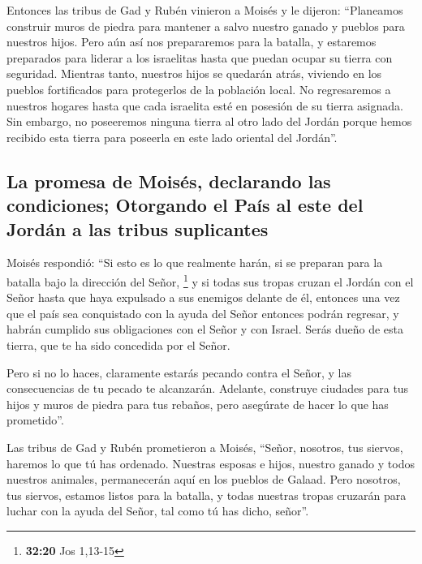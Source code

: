  Entonces las tribus de Gad y Rubén vinieron a Moisés y
le dijeron: ``Planeamos construir muros de piedra para mantener a salvo
nuestro ganado y pueblos para nuestros hijos.  Pero aún
así nos prepararemos para la batalla, y estaremos preparados para
liderar a los israelitas hasta que puedan ocupar su tierra con
seguridad. Mientras tanto, nuestros hijos se quedarán atrás, viviendo en
los pueblos fortificados para protegerlos de la población local.
 No regresaremos a nuestros hogares hasta que cada
israelita esté en posesión de su tierra asignada.  Sin
embargo, no poseeremos ninguna tierra al otro lado del Jordán porque
hemos recibido esta tierra para poseerla en este lado oriental del
Jordán''.

\hypertarget{la-promesa-de-moisuxe9s-declarando-las-condiciones-otorgando-el-pauxeds-al-este-del-jorduxe1n-a-las-tribus-suplicantes}{%
\subsection{La promesa de Moisés, declarando las condiciones; Otorgando
el País al este del Jordán a las tribus
suplicantes}\label{la-promesa-de-moisuxe9s-declarando-las-condiciones-otorgando-el-pauxeds-al-este-del-jorduxe1n-a-las-tribus-suplicantes}}

 Moisés respondió: ``Si esto es lo que realmente harán,
si se preparan para la batalla bajo la dirección del Señor, \footnote{\textbf{32:20}
  Jos 1,13-15}  y si todas sus tropas cruzan el Jordán
con el Señor hasta que haya expulsado a sus enemigos delante de él,
 entonces una vez que el país sea conquistado con la
ayuda del Señor entonces podrán regresar, y habrán cumplido sus
obligaciones con el Señor y con Israel. Serás dueño de esta tierra, que
te ha sido concedida por el Señor.

 Pero si no lo haces, claramente estarás pecando contra
el Señor, y las consecuencias de tu pecado te alcanzarán.
 Adelante, construye ciudades para tus hijos y muros de
piedra para tus rebaños, pero asegúrate de hacer lo que has prometido''.

 Las tribus de Gad y Rubén prometieron a Moisés, ``Señor,
nosotros, tus siervos, haremos lo que tú has ordenado. 
Nuestras esposas e hijos, nuestro ganado y todos nuestros animales,
permanecerán aquí en los pueblos de Galaad.  Pero
nosotros, tus siervos, estamos listos para la batalla, y todas nuestras
tropas cruzarán para luchar con la ayuda del Señor, tal como tú has
dicho, señor''.

